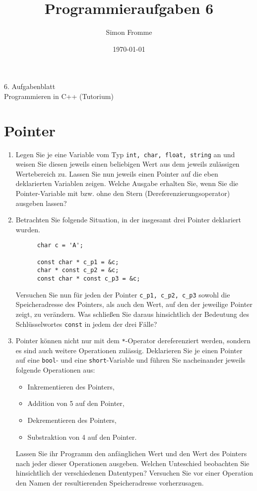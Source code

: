 \documentclass[paper=a4, fontsize=11pt, twoside]{scrartcl}
\title{Programmieraufgaben 6}
\author{Simon Fromme}
\date{\normalsize\today}
\begin{document}
\vspace*{0.75\baselineskip}
\begin{center}
  \Large 6. Aufgabenblatt \\\vspace{0.5em} \large Programmieren in C++ (Tutorium)
\end{center}

\section*{Pointer}
\begin{enumerate}
  \item Legen Sie je eine Variable vom Typ \texttt{int, char, float, string} an und weisen Sie diesen jeweils einen beliebigen Wert aus dem jeweils zulässigen Wertebereich zu. Lassen Sie nun jeweils einen Pointer auf die eben deklarierten Variablen zeigen. Welche Ausgabe erhalten Sie, wenn Sie die Pointer-Variable mit bzw. ohne den Stern (Dereferenzierungsoperator) ausgeben lassen?
  \item 
    Betrachten Sie folgende Situation, in der insgesamt drei Pointer deklariert wurden.
    \begin{verbatim}
      char c = 'A';

      const char * c_p1 = &c;
      char * const c_p2 = &c;
      const char * const c_p3 = &c;
    \end{verbatim}
  Versuchen Sie nun für jeden der Pointer \texttt{c_p1, c_p2, c_p3} sowohl die Speicheradresse des Pointers, als auch den Wert, auf den der jeweilige Pointer zeigt, zu verändern. Was schließen Sie daraus hinsichtlich der Bedeutung des Schlüsselwortes \texttt{const} in jedem der drei Fälle?
  \item Pointer können nicht nur mit dem \texttt{*}-Operator dereferenziert werden, sondern es sind auch weitere Operationen zulässig.
  Deklarieren Sie je einen Pointer auf eine \texttt{bool}- und eine \texttt{short}-Variable und führen Sie nacheinander jeweils folgende Operationen aus:
  \begin{itemize}
    \item Inkrementieren des Pointers,
    \item Addition von 5 auf den Pointer,
    \item Dekrementieren des Pointers,
    \item Substraktion von 4 auf den Pointer.   
  \end{itemize}
Lassen Sie ihr Programm den anfänglichen Wert und den Wert des Pointers nach jeder dieser Operationen ausgeben. Welchen Unteschied beobachten Sie hinsichtlich der verschiedenen Datentypen? Versuchen Sie vor einer Operation den Namen der resultierenden Speicheradresse vorherzusagen. 
\end{enumerate}
\end{document}
